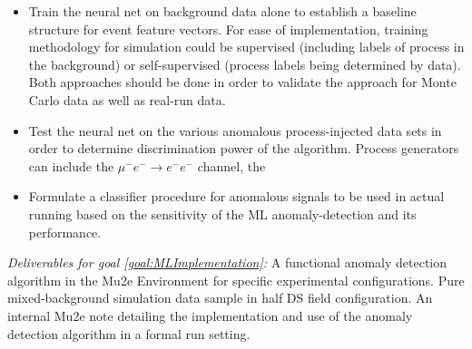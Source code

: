 \documentclass[12pt]{article}
\newcommand{\muEtoEE}{\mu^- e^- \to e^- e^-}
\begin{document}
\begin{enumerate}
\begin{itemize}
     \item Train the neural net on background data alone to establish a baseline structure for event feature vectors. For ease of implementation, training methodology for simulation could be supervised (including labels of process in the background) or self-supervised (process labels being determined by data). Both approaches should be done in order to validate the approach for Monte Carlo data as well as real-run data.
     \item Test the neural net on the various anomalous process-injected data sets in order to determine discrimination power of the algorithm. Process generators can include the $\muEtoEE$ channel, the 
     \item Formulate a classifier procedure for anomalous signals to be used in actual running based on the sensitivity of the ML anomaly-detection and its performance.
 \end{itemize} 
 \textit{Deliverables for goal \ref{goal:MLImplementation}:} A functional anomaly detection algorithm in the Mu2e Environment for specific experimental configurations. Pure mixed-background simulation data sample in half DS field configuration. An internal Mu2e note detailing the implementation and use of the anomaly detection algorithm in a formal run setting.
 

\end{enumerate}
\end{document}
